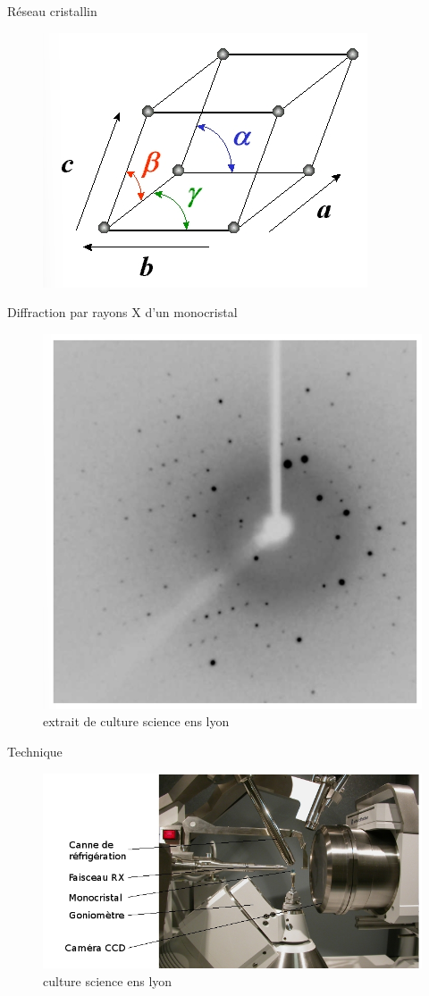 \documentclass[10pt]{beamer}
\begin{document}
\begin{frame}{Réseau cristallin}
    \begin{figure}
        \centering
        \includegraphics[width=.5\textwidth]{cristal.png}
    \end{figure}
\end{frame}

\begin{frame}{Diffraction par rayons X d'un monocristal}
    \begin{figure}
        \centering
        \includegraphics[width=.5\textwidth]{diffraction_monocristal.png}
        \caption{extrait de culture science ens lyon}
    \end{figure}
\end{frame}

\begin{frame}{Technique}
    \begin{figure}
        \centering
        \includegraphics[width=.5\textwidth]{Diffractometre.png}
        \caption{culture science ens lyon}
    \end{figure}
    
\end{frame}
\end{document}
